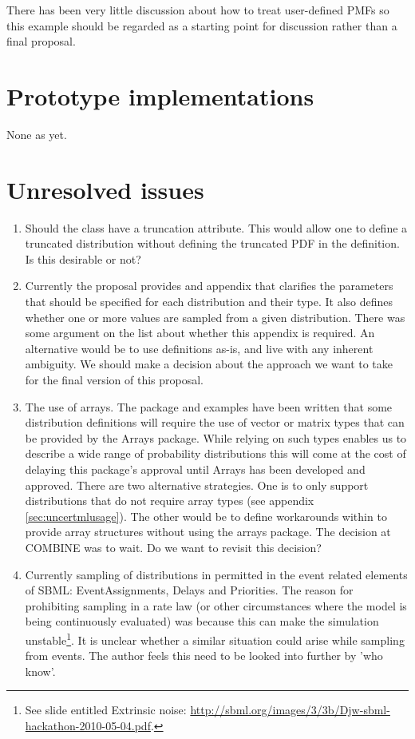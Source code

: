 \documentclass[draftspec]{sbmlpkgspec}
\begin{document}
There has been very little discussion\contraversial{} about how to treat user-defined
PMFs so this example should be regarded as a starting point for
discussion rather than a final proposal.


\section{Prototype implementations}

None as yet.

\section{Unresolved issues}
\label{sec:unresolved}

\begin{enumerate}
\item Should the  class have a truncation
  attribute. This would allow one to define a truncated distribution
  without defining the truncated PDF in the \mathml definition. Is
  this desirable or not?
\item Currently the proposal provides and appendix that clarifies the
  parameters that should be specified for each \uncertml distribution and their
  type. It also defines whether one or more values are sampled from a
  given distribution. There was some argument on the list about
  whether this appendix is required. An alternative would be to use
  \uncertml definitions as-is, and live with any inherent
  ambiguity. We should make a decision about the approach we want to
  take for the final version of this proposal.
\item The use of arrays. The package and examples have been written
  that some distribution definitions will require the use of vector or
  matrix types that can be provided by the Arrays package. While
  relying on such types enables us to describe a wide range of
  probability distributions this will come at the cost of delaying
  this package's approval until Arrays has been developed and
  approved. There are two alternative strategies. One is to only
  support distributions that do not require array types (see appendix
  \ref{sec:uncertmlusage}). The other would be to define workarounds
  within \distribshort to provide array structures without using the
  arrays package. The decision at COMBINE was to wait. Do we want to
  revisit this decision?
\item Currently sampling of distributions in permitted in the event
  related elements of SBML: EventAssignments, Delays and
Priorities. The reason for prohibiting sampling in a rate law (or other
circumstances where the model is being continuously evaluated) was
because this can make the simulation unstable\footnote{See slide entitled Extrinsic
  noise:
  \url{http://sbml.org/images/3/3b/Djw-sbml-hackathon-2010-05-04.pdf}.}. It
is unclear whether a similar situation could arise while sampling from
events. The author feels this need to be looked into further by 'who
know'.


\end{enumerate}
\end{document}
